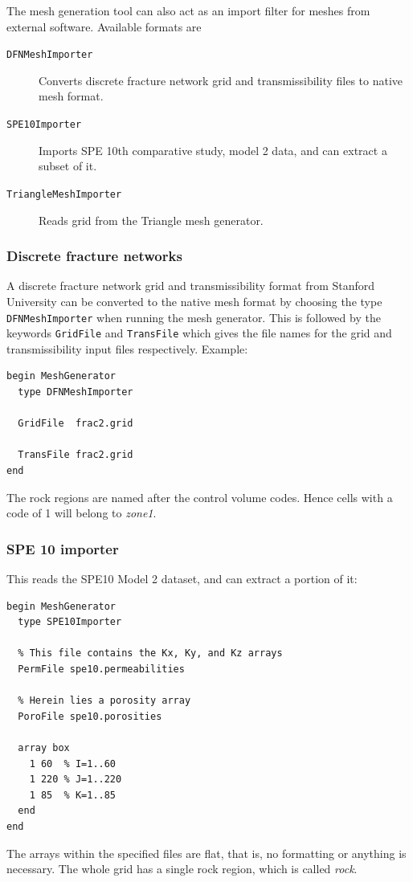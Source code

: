 
\label{sec:import-filters}
The mesh generation tool can also act as an import filter for meshes
from external software. Available formats are
%
\begin{description}
\item[\texttt{DFNMeshImporter}] Converts discrete fracture network
  grid and transmissibility files to native mesh format.
\item[\texttt{SPE10Importer}] Imports SPE 10th comparative study,
  model 2 data, and can extract a subset of it.
\item[\texttt{TriangleMeshImporter}] Reads grid from the Triangle mesh
  generator.
\end{description}
%

\subsubsection{Discrete fracture networks}
\label{sec:discr-fract-netw}

A discrete fracture network grid and transmissibility format from
Stanford University can be converted to the native mesh format by
choosing the type \texttt{DFNMeshImporter} when running the mesh
generator. This is followed by the keywords \texttt{GridFile} and
\texttt{TransFile} which gives the file names for the grid and
transmissibility input files respectively. Example:
%
\begin{verbatim}
begin MeshGenerator
  type DFNMeshImporter

  GridFile  frac2.grid

  TransFile frac2.grid
end
\end{verbatim}
The rock regions are named after the control volume codes. Hence cells
with a code of 1 will belong to \emph{zone1}.

\subsubsection{SPE 10 importer}

This reads the SPE10 Model 2 dataset, and can extract a portion of
it:

\begin{verbatim}
begin MeshGenerator
  type SPE10Importer

  % This file contains the Kx, Ky, and Kz arrays
  PermFile spe10.permeabilities

  % Herein lies a porosity array
  PoroFile spe10.porosities

  array box
    1 60  % I=1..60
    1 220 % J=1..220
    1 85  % K=1..85
  end
end
\end{verbatim}
The arrays within the specified files are flat, that is, no formatting
or anything is necessary. The whole grid has a single rock region,
which is called \emph{rock}.

